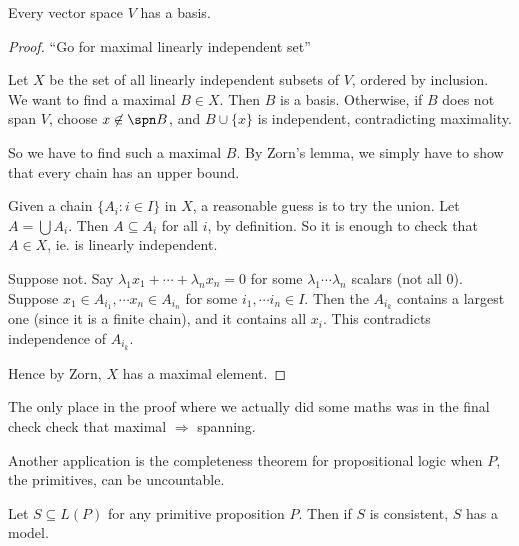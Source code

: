 \documentclass[a4paper]{article}
\begin{document}
\begin{thm}
  Every vector space $V$ has a basis.
\end{thm}


\begin{proof}
  ``Go for maximal linearly independent set''

  Let $X$ be the set of all linearly independent subsets of $V$, ordered by inclusion. We want to find a maximal $B\in X$. Then $B$ is a basis. Otherwise, if $B$ does not span $V$, choose $x\not\in \spn B$, and $B\cup \{x\}$ is independent, contradicting maximality. 
  
  So we have to find such a maximal $B$. By Zorn's lemma, we simply have to show that every chain has an upper bound.

  Given a chain $\{A_i: i\in I\}$ in $X$, a reasonable guess is to try the union. Let $A = \bigcup A_i$. Then $A\subseteq A_i$ for all $i$, by definition. So it is enough to check that $A\in X$, ie. is linearly independent.

  Suppose not. Say $\lambda_1x_1 + \cdots + \lambda_nx_n = 0$ for some $\lambda_1 \cdots \lambda_n$ scalars (not all $0$). Suppose $x_1 \in A_{i_1}, \cdots x_n \in A_{i_n}$ for some $i_1, \cdots i_n \in I$. Then the $A_{i_k}$ contains a largest one (since it is a finite chain), and it contains all $x_i$. This contradicts independence of $A_{i_k}$.
  
  Hence by Zorn, $X$ has a maximal element.
\end{proof}
\note The only place in the proof where we actually did some maths was in the final check check that maximal $\Rightarrow$ spanning.

Another application is the completeness theorem for propositional logic when $P$, the primitives, can be uncountable.

\begin{thm}
  Let $S\subseteq L(P)$ for any primitive proposition $P$. Then if $S$ is consistent, $S$ has a model.
\end{thm}
\end{document}
